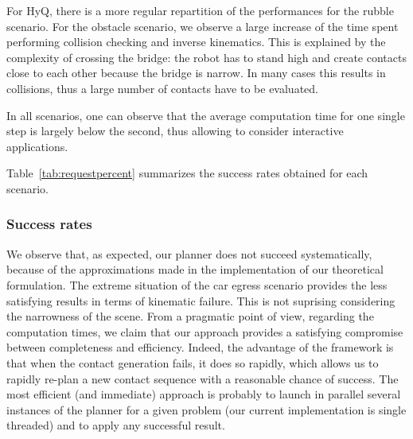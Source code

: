 For HyQ, there is a more regular repartition of the performances for the rubble scenario. For the obstacle scenario,
we observe a large increase of the time spent performing collision checking and inverse kinematics. This is explained
by the complexity of crossing the bridge: the robot has to stand high and create contacts close to each other because
the bridge is narrow. In many cases this results in collisions, thus a large number of contacts have to be evaluated.

In all scenarios, one can observe that the average computation time for one single step is largely below the second,
thus allowing to consider \gls{interactive} applications. 

Table~\ref{tab:requestpercent} summarizes the success rates obtained for each scenario.

\subsubsection{Success rates}
We observe that, as expected, our planner does not succeed systematically, because of the approximations made in the implementation
of our theoretical formulation. The extreme situation of the car egress scenario provides the less satisfying results in terms of kinematic failure. This is not
suprising considering the narrowness of the scene.
From a pragmatic point of view, regarding the computation times, we claim that our approach provides a satisfying compromise between completeness and efficiency.
Indeed, the advantage of the framework is that when the contact generation fails, it does so rapidly, which allows us to rapidly re-plan a new contact sequence with a reasonable chance of success.
The most efficient (and immediate) approach is probably to launch in parallel several instances of the planner for a given problem (our current implementation is single threaded) and to apply any successful result.

